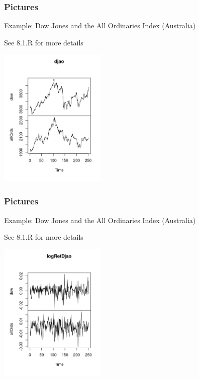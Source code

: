 \documentclass{beamer}
\begin{document}

\begin{frame}[fragile]
\frametitle{Pictures}

Example: Dow Jones and the All Ordinaries Index (Australia)
\newline

See 8.1.R for more details

\begin{center}
\includegraphics[width=2.00in]{./pics/Rplot}
\end{center}



\end{frame}

\begin{frame}[fragile]
\frametitle{Pictures}

Example: Dow Jones and the All Ordinaries Index (Australia)
\newline

See 8.1.R for more details

\begin{center}
\includegraphics[width=2.00in]{./pics/Rplot01}
\end{center}



\end{frame}
\end{document}

